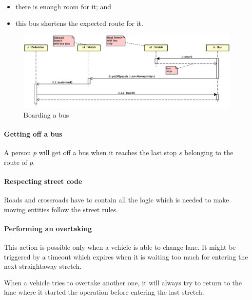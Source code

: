 \begin{itemize}
  \item there is enough room for it; and
  \item this bus shortens the expected route for it.
\end{itemize}

\begin{figure}[H]
  \centering
  \includegraphics[width=\columnwidth,trim=1 0 0 0,clip]
    {images/solution/bus_boarding.eps}
  \caption{Boarding a bus}
  \label{fig:app-inter-board-bus}
\end{figure}

\paragraph{Getting off a bus} A person $p$ will get off a bus when it reaches
the last stop $s$ belonging to the route of $p$.

\paragraph{Respecting street code} Roads and crossroads have to contain 
all the logic which is needed to make moving entities follow the street rules.

\paragraph{Performing an overtaking} This action is possible only when a
vehicle is able to change lane. It might be triggered by a timeout which
expires when it is waiting too much for entering the next straightaway stretch.

When a vehicle tries to overtake another one, it will always try to return to
the lane where it started the operation before entering the last stretch.


